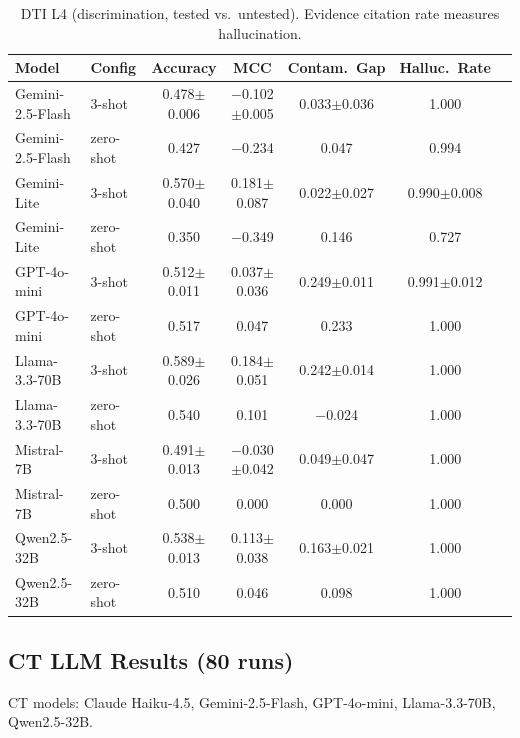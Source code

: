 \begin{table}[h]
\centering
\caption{DTI L4 (discrimination, tested vs.\ untested). Evidence citation rate measures hallucination.}
\label{tab:dti_l4_full}
\scriptsize
\begin{tabular}{@{}llccccc@{}}
\toprule
\textbf{Model} & \textbf{Config} & \textbf{Accuracy} & \textbf{MCC} & \textbf{Contam.\ Gap} & \textbf{Halluc.\ Rate} \\
\midrule
Gemini-2.5-Flash & 3-shot & 0.478$\pm$0.006 & $-$0.102$\pm$0.005 & 0.033$\pm$0.036 & 1.000 \\
Gemini-2.5-Flash & zero-shot & 0.427 & $-$0.234 & 0.047 & 0.994 \\
Gemini-Lite & 3-shot & 0.570$\pm$0.040 & 0.181$\pm$0.087 & 0.022$\pm$0.027 & 0.990$\pm$0.008 \\
Gemini-Lite & zero-shot & 0.350 & $-$0.349 & 0.146 & 0.727 \\
GPT-4o-mini & 3-shot & 0.512$\pm$0.011 & 0.037$\pm$0.036 & 0.249$\pm$0.011 & 0.991$\pm$0.012 \\
GPT-4o-mini & zero-shot & 0.517 & 0.047 & 0.233 & 1.000 \\
Llama-3.3-70B & 3-shot & 0.589$\pm$0.026 & 0.184$\pm$0.051 & 0.242$\pm$0.014 & 1.000 \\
Llama-3.3-70B & zero-shot & 0.540 & 0.101 & $-$0.024 & 1.000 \\
Mistral-7B & 3-shot & 0.491$\pm$0.013 & $-$0.030$\pm$0.042 & 0.049$\pm$0.047 & 1.000 \\
Mistral-7B & zero-shot & 0.500 & 0.000 & 0.000 & 1.000 \\
Qwen2.5-32B & 3-shot & 0.538$\pm$0.013 & 0.113$\pm$0.038 & 0.163$\pm$0.021 & 1.000 \\
Qwen2.5-32B & zero-shot & 0.510 & 0.046 & 0.098 & 1.000 \\
\bottomrule
\end{tabular}
\end{table}

\clearpage

\subsection{CT LLM Results (80 runs)}

CT models: Claude Haiku-4.5, Gemini-2.5-Flash, GPT-4o-mini, Llama-3.3-70B, Qwen2.5-32B.

